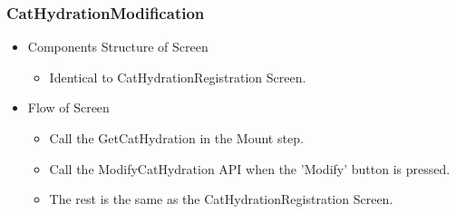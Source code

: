 \documentclass[conference]{IEEEtran}
\begin{document}
\subsubsection{CatHydrationModification}
\begin{itemize}
    \item Components Structure of Screen
    \begin{itemize}
        \item Identical to CatHydrationRegistration Screen.
    \end{itemize}
    \item Flow of Screen
    \begin{itemize}
        \item Call the GetCatHydration in the Mount step.
        \item Call the ModifyCatHydration API when the 'Modify' button is pressed.
        \item The rest is the same as the CatHydrationRegistration Screen.\\
    \end{itemize}
\end{itemize}
\end{document}
